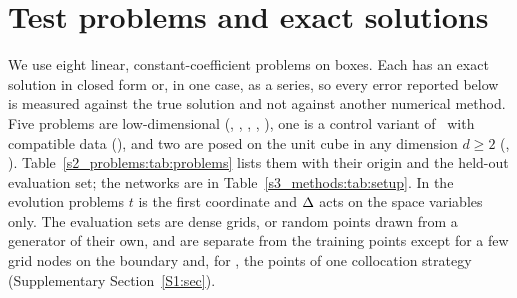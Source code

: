 \section{Test problems and exact solutions}\label{s2_problems:sec}

We use eight linear, constant-coefficient problems on boxes. Each has an exact solution in
closed form or, in one case, as a series, so every error reported below is measured
against the true solution and not against another numerical method. Five problems are
low-dimensional (\PH, \PWone, \PWtwo, \PLtwo, \PLthree), one is a control variant of
\PLthree\ with compatible data (\PLthreeS), and two are posed on the unit cube in any
dimension $d\ge 2$ (\Pone, \Ptwo). Table~\ref{s2_problems:tab:problems} lists them with their
origin and the held-out evaluation set; the networks are in
Table~\ref{s3_methods:tab:setup}. In the evolution problems $t$ is the
first coordinate and $\Delta$ acts on the space variables only. The evaluation sets are dense
grids, or random points drawn from a generator of their own, and are separate from the
training points except for a few grid nodes on the boundary and, for \PLthree, the points of
one collocation strategy (Supplementary Section~\ref{S1:sec}).


